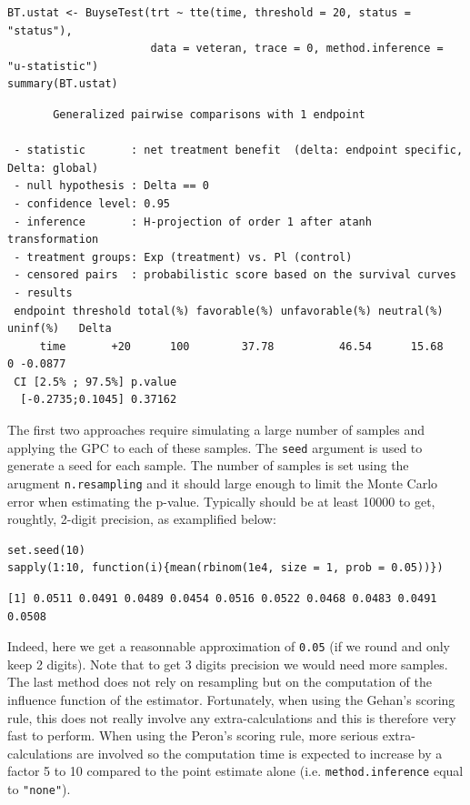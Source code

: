 \documentclass[12pt]{article}
\begin{document}
\lstset{language=r,label= ,caption= ,captionpos=b,numbers=none}
\begin{lstlisting}
BT.ustat <- BuyseTest(trt ~ tte(time, threshold = 20, status = "status"),
                      data = veteran, trace = 0, method.inference = "u-statistic") 
summary(BT.ustat)
\end{lstlisting}

\begin{verbatim}
       Generalized pairwise comparisons with 1 endpoint

 - statistic       : net treatment benefit  (delta: endpoint specific, Delta: global) 
 - null hypothesis : Delta == 0 
 - confidence level: 0.95 
 - inference       : H-projection of order 1 after atanh transformation 
 - treatment groups: Exp (treatment) vs. Pl (control) 
 - censored pairs  : probabilistic score based on the survival curves
 - results
 endpoint threshold total(%) favorable(%) unfavorable(%) neutral(%) uninf(%)   Delta
     time       +20      100        37.78          46.54      15.68        0 -0.0877
 CI [2.5% ; 97.5%] p.value 
  [-0.2735;0.1045] 0.37162
\end{verbatim}

The first two approaches require simulating a large number of samples
and applying the GPC to each of these samples. The \texttt{seed} argument is
used to generate a seed for each sample. The number of samples is set
using the arugment \texttt{n.resampling} and it should large enough to limit
the Monte Carlo error when estimating the p-value. Typically should be
at least 10000 to get, roughtly, 2-digit precision, as examplified
below:
\lstset{language=r,label= ,caption= ,captionpos=b,numbers=none}
\begin{lstlisting}
set.seed(10)
sapply(1:10, function(i){mean(rbinom(1e4, size = 1, prob = 0.05))})
\end{lstlisting}

\begin{verbatim}
[1] 0.0511 0.0491 0.0489 0.0454 0.0516 0.0522 0.0468 0.0483 0.0491 0.0508
\end{verbatim}

Indeed, here we get a reasonnable approximation of \texttt{0.05} (if we round
and only keep 2 digits). Note that to get 3 digits precision we would
need more samples. The last method does not rely on resampling but on
the computation of the influence function of the
estimator. Fortunately, when using the Gehan's scoring rule, this does
not really involve any extra-calculations and this is therefore very
fast to perform. When using the Peron's scoring rule, more serious
extra-calculations are involved so the computation time is expected to
increase by a factor 5 to 10 compared to the point estimate alone
(i.e. \texttt{method.inference} equal to \texttt{"none"}).
\end{document}
